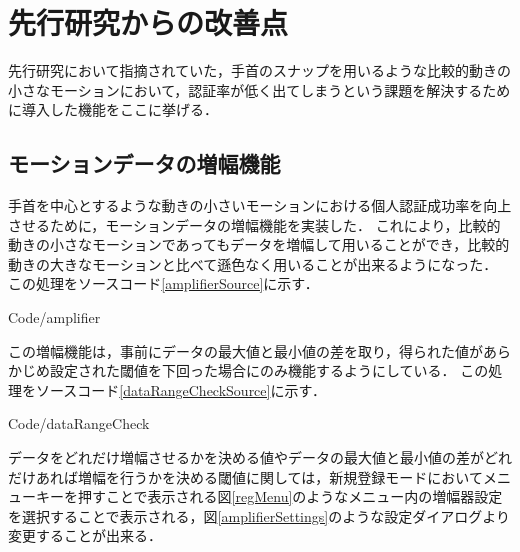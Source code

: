 \documentclass[11pt]{jreport}
\renewcommand{\slash}{/}
\begin{document}
    \section{先行研究からの改善点}
    先行研究において指摘されていた，手首のスナップを用いるような比較的動きの小さなモーションにおいて，認証率が低く出てしまうという課題を解決するために導入した機能をここに挙げる．

        \subsection{モーションデータの増幅機能}
        手首を中心とするような動きの小さいモーションにおける個人認証成功率を向上させるために，モーションデータの増幅機能を実装した．
        これにより，比較的動きの小さなモーションであってもデータを増幅して用いることができ，比較的動きの大きなモーションと比べて遜色なく用いることが出来るようになった．
        この処理をソースコード\ref{amplifierSource}に示す．

        
        {Code\slash amplifier}

        この増幅機能は，事前にデータの最大値と最小値の差を取り，得られた値があらかじめ設定された閾値を下回った場合にのみ機能するようにしている．
        この処理をソースコード\ref{dataRangeCheckSource}に示す．

        
        {Code\slash dataRangeCheck}

        データをどれだけ増幅させるかを決める値やデータの最大値と最小値の差がどれだけあれば増幅を行うかを決める閾値に関しては，新規登録モードにおいてメニューキーを押すことで表示される図\ref{regMenu}のようなメニュー内の増幅器設定を選択することで表示される，図\ref{amplifierSettings}のような設定ダイアログより変更することが出来る．
\end{document}
